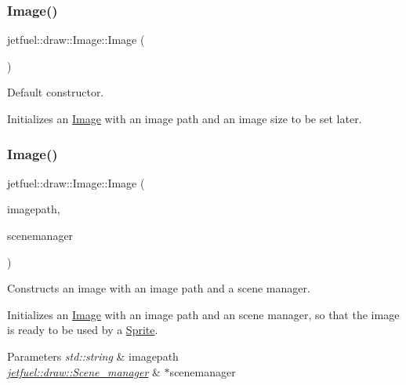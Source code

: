 \subsubsection{\texorpdfstring{Image()}{Image()}\hspace{0.1cm}{\footnotesize\ttfamily [1/3]}}
{\footnotesize\ttfamily jetfuel\+::draw\+::\+Image\+::\+Image (\begin{DoxyParamCaption}{ }\end{DoxyParamCaption})\hspace{0.3cm}{\ttfamily [inline]}}



Default constructor. 

Initializes an \hyperlink{classjetfuel_1_1draw_1_1Image}{Image} with an image path and an image size to be set later. \mbox{\label{classjetfuel_1_1draw_1_1Image_a36c7a9de74ed515a90b5688d7efb040c}} 
\subsubsection{\texorpdfstring{Image()}{Image()}\hspace{0.1cm}{\footnotesize\ttfamily [2/3]}}
{\footnotesize\ttfamily jetfuel\+::draw\+::\+Image\+::\+Image (\begin{DoxyParamCaption}\item[{const std\+::string}]{imagepath,  }\item[{\hyperlink{classjetfuel_1_1draw_1_1Scene__manager}{Scene\+\_\+manager} $\ast$}]{scenemanager }\end{DoxyParamCaption})}



Constructs an image with an image path and a scene manager. 

Initializes an \hyperlink{classjetfuel_1_1draw_1_1Image}{Image} with an image path and an scene manager, so that the image is ready to be used by a \hyperlink{classjetfuel_1_1draw_1_1Sprite}{Sprite}.


\begin{DoxyParams}{Parameters}
{\em std\+::string} & imagepath \\
\hline
{\em \hyperlink{classjetfuel_1_1draw_1_1Scene__manager}{jetfuel\+::draw\+::\+Scene\+\_\+manager}} & $\ast$scenemanager \\
\hline
\end{DoxyParams}
\mbox{\label{classjetfuel_1_1draw_1_1Image_a80771f30728e311a58d7e0fa5844a6d5}} 
